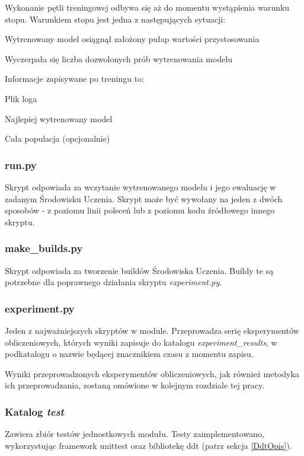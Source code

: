 Wykonanie pętli treningowej odbywa się aż do momentu wystąpienia warunku stopu. Warunkiem stopu jest jedna z następujących sytuacji:
\begin{enumerate*}
\item Wytrenowany model osiągnął założony pułap wartości przystosowania
\item Wyczerpała się liczba dozwolonych prób wytrenowania modelu
\end{enumerate*}
Informacje zapisywane po treningu to:
\begin{itemize*}
\item Plik loga
\item Najlepiej wytrenowany model
\item Cała populacja (opcjonalnie)
\end{itemize*}

\subsubsection{run.py}
Skrypt odpowiada za wczytanie wytrenowanego modelu i jego ewaluację w zadanym Środowisku Uczenia. Skrypt może być wywołany na jeden z dwóch sposobów - z poziomu linii poleceń lub z poziomu kodu źródłowego innego skryptu.

\subsubsection{make\_builds.py}
Skrypt odpowiada za tworzenie buildów Środowiska Uczenia. Buildy te są potrzebne dla poprawnego działania skryptu \textit{experiment.py}.

\subsubsection{experiment.py}
Jeden z najważniejszych skryptów w module. Przeprowadza serię eksperymentów obliczeniowych, których wyniki zapisuje do katalogu \textit{experiment\_results}, w podkatalogu o nazwie będącej znacznikiem czasu z momentu zapisu.

Wyniki przeprowadzonych eksperymentów obliczeniowych, jak również metodyka ich przeprowadzania, zostaną omówione w kolejnym rozdziale tej pracy.

\subsubsection{Katalog \textit{test}}
Zawiera zbiór testów jednostkowych modułu. Testy zaimplementowano, wykorzystując framework unittest \cite{python:unittest} oraz bibliotekę ddt (patrz sekcja \ref{DdtOpis}).

